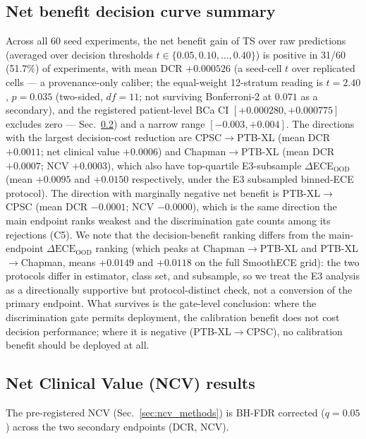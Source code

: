 \documentclass[review,12pt,nonatbib]{elsarticle}
\begin{document}
\subsection{Net benefit decision curve summary}
\label{sec:net_benefit_summary}
Across all 60 seed experiments, the net benefit gain of TS over raw
predictions (averaged over decision thresholds $t \in \{0.05, 0.10,
\ldots, 0.40\}$) is positive in 31/60 (51.7\%) of experiments, with
mean DCR $+0.000526$ (a seed-cell $t$ over replicated cells --- a
provenance-only caliber; the equal-weight 12-stratum reading is
$t=2.40$, $p=0.035$ (two-sided, $df=11$; not surviving
Bonferroni-2 at $0.071$ as a secondary), and the registered
patient-level BCa CI $[+0.000280, +0.000775]$ excludes zero ---
Sec.~\ref{sec:ncv_results}) and a narrow range
$[-0.003, +0.004]$. The directions with
the largest decision-cost reduction are CPSC$\rightarrow$PTB-XL
(mean DCR $+0.0011$; net clinical value $+0.0006$) and
Chapman$\rightarrow$PTB-XL (mean DCR $+0.0007$; NCV $+0.0003$), which
also have top-quartile E3-subsample $\Delta$ECE$_{\text{OOD}}$ (mean
$+0.0095$ and $+0.0150$ respectively, under the E3 subsampled
binned-ECE protocol). The direction
with marginally negative net benefit is PTB-XL$\rightarrow$CPSC (mean
DCR $-0.0001$; NCV $-0.0000$), which is the same direction the main
endpoint ranks weakest and the discrimination gate counts among its
rejections (C5). We note that the decision-benefit ranking
differs from the main-endpoint $\Delta\text{ECE}_{\text{OOD}}$ ranking
(which peaks at Chapman$\rightarrow$PTB-XL and PTB-XL$\rightarrow$Chapman,
means $+0.0149$ and $+0.0118$ on the full SmoothECE grid): the two
protocols differ in estimator, class set, and subsample, so we treat
the E3 analysis as a directionally supportive but protocol-distinct
check, not a conversion of the primary endpoint. What survives is the
gate-level conclusion: where the discrimination gate permits
deployment, the calibration benefit does not cost decision
performance; where it is negative (PTB-XL$\rightarrow$CPSC), no
calibration benefit should be deployed at all.

\subsection{Net Clinical Value (NCV) results}
\label{sec:ncv_results}
The pre-registered NCV (Sec.~\ref{sec:ncv_methods}) is BH-FDR corrected
($q=0.05$) across the two secondary endpoints (DCR, NCV).
\end{document}
